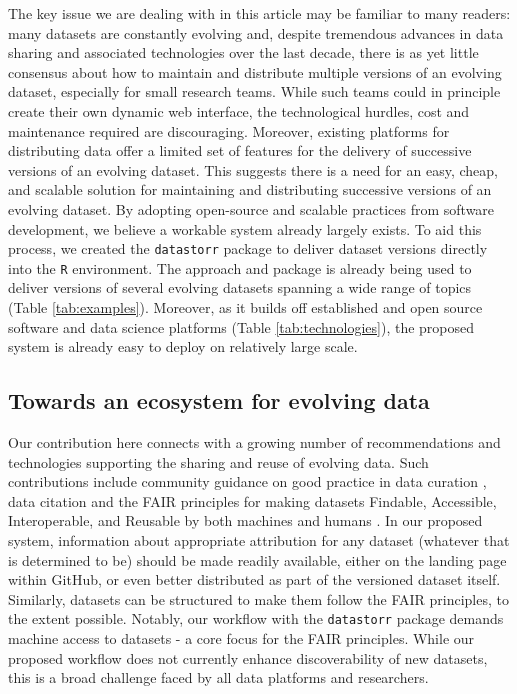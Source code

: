 \documentclass[a4paper,num-refs]{oup-contemporary}
\begin{document}
The key issue we are dealing with in this article may be familiar to many readers: many datasets are constantly evolving and, despite tremendous advances in data sharing and associated technologies over the last decade, there is as yet little consensus about how to maintain and distribute multiple versions of an evolving dataset, especially for small research teams. While such teams could in principle create their own dynamic web interface, the technological hurdles, cost and maintenance required are discouraging. Moreover, existing platforms for distributing data offer a limited set of features for the delivery of successive versions of an evolving dataset. This suggests there is a need for an easy, cheap, and scalable solution for maintaining and distributing successive versions of an evolving dataset. By adopting open-source and scalable practices from software development, we believe a workable system already largely exists. To aid this process, we created the \texttt{datastorr} package to deliver dataset versions directly into the \texttt{R} environment. The approach and package is already being used to deliver versions of several evolving datasets spanning a wide range of topics (Table \ref{tab:examples}). Moreover, as it builds off established and open source software and data science platforms (Table \ref{tab:technologies}), the proposed system is already easy to deploy on relatively large scale.

\subsection{Towards an ecosystem for evolving data}

Our contribution here connects with a growing number of recommendations and technologies supporting the sharing and reuse of evolving data. Such contributions include community guidance on good practice in data curation \cite{Goodman-2014, Lowndes-2017}, data citation \cite{Force11-2014} and the FAIR principles for making datasets Findable, Accessible, Interoperable, and Reusable by both machines and humans \cite{Wilkinson-2016}. In our proposed system, information about appropriate attribution for any dataset  (whatever that is determined to be) should be made readily available, either on the landing page within GitHub, or even better distributed as part of the versioned dataset itself. Similarly, datasets can be structured to make them follow the FAIR principles, to the extent possible. Notably, our workflow with the \texttt{datastorr} package demands machine access to datasets - a core focus for the FAIR principles. While our proposed workflow does not currently enhance discoverability of new datasets, this is a broad challenge faced by all data platforms and researchers.
\end{document}
